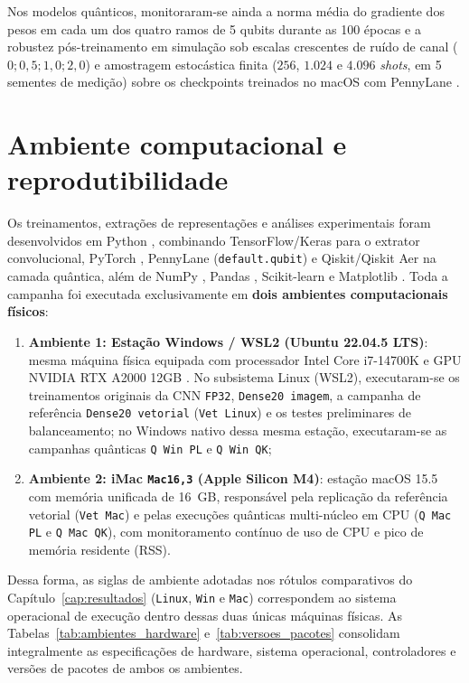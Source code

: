 \documentclass[
    12pt,
    openright,
    oneside,
    a4paper,
    english,
    brazil
]{abntex2}
\begin{document}
Nos modelos quânticos, monitoraram-se ainda a norma média do gradiente dos pesos em cada um dos quatro ramos de 5 qubits durante as 100 épocas e a robustez pós-treinamento em simulação sob escalas crescentes de ruído de canal (\(0; 0{,}5; 1{,}0; 2{,}0\)) e amostragem estocástica finita (\(256\), \(1.024\) e \(4.096\) \textit{shots}, em 5 sementes de medição) sobre os checkpoints treinados no macOS com PennyLane \cite{mcclean2018barren,cerezo2021variational,nielsen2010quantum}.

\section{Ambiente computacional e reprodutibilidade}
\label{subsec:tecnologias}

Os treinamentos, extrações de representações e análises experimentais foram desenvolvidos em Python \cite{vanrossum2009python}, combinando TensorFlow/Keras para o extrator convolucional, PyTorch \cite{paszke2019pytorch}, PennyLane (\texttt{default.qubit}) \cite{bergholm2018pennylane} e Qiskit/Qiskit Aer \cite{javadiabhari2024qiskit} na camada quântica, além de NumPy \cite{harris2020numpy}, Pandas \cite{mckinney2010pandas}, Scikit-learn \cite{pedregosa2011scikitlearn} e Matplotlib \cite{hunter2007matplotlib}. Toda a campanha foi executada exclusivamente em \textbf{dois ambientes computacionais físicos}:
\begin{enumerate}
    \item \textbf{Ambiente 1: Estação Windows / WSL2 (Ubuntu 22.04.5 LTS)}: mesma máquina física equipada com processador Intel Core i7-14700K e GPU NVIDIA RTX A2000 12GB \cite{nickolls2008cuda,faj2023warpspeed}. No subsistema Linux (WSL2), executaram-se os treinamentos originais da CNN \texttt{FP32}, \texttt{Dense20 imagem}, a campanha de referência \texttt{Dense20 vetorial} (\texttt{Vet Linux}) e os testes preliminares de balanceamento; no Windows nativo dessa mesma estação, executaram-se as campanhas quânticas \texttt{Q Win PL} e \texttt{Q Win QK};
    \item \textbf{Ambiente 2: iMac \texttt{Mac16,3} (Apple Silicon M4)}: estação macOS 15.5 com memória unificada de 16~GB, responsável pela replicação da referência vetorial (\texttt{Vet Mac}) e pelas execuções quânticas multi-núcleo em CPU (\texttt{Q Mac PL} e \texttt{Q Mac QK}), com monitoramento contínuo de uso de CPU e pico de memória residente (RSS).
\end{enumerate}

Dessa forma, as siglas de ambiente adotadas nos rótulos comparativos do Capítulo~\ref{cap:resultados} (\texttt{Linux}, \texttt{Win} e \texttt{Mac}) correspondem ao sistema operacional de execução dentro dessas duas únicas máquinas físicas. As Tabelas~\ref{tab:ambientes_hardware} e~\ref{tab:versoes_pacotes} consolidam integralmente as especificações de hardware, sistema operacional, controladores e versões de pacotes de ambos os ambientes.
\end{document}
